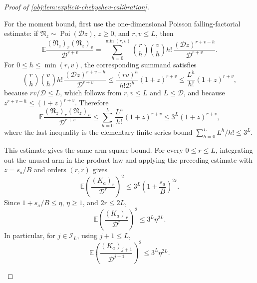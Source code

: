 \documentclass[11pt]{article}
\begin{document}
\begin{proof}[Proof of \cref{obj:lem:explicit-chebyshev-calibration}]
\begin{enumerate}
For the moment bound, first use the one-dimensional Poisson falling-factorial estimate: if
\(\mathfrak N_z\sim\operatorname{Poi}(\mathscr D z)\), \(z\ge0\), and \(r,v\le L\), then
\[
\mathbb E\frac{(\mathfrak N_z)_r(\mathfrak N_z)_v}{\mathscr D^{r+v}}
=
\sum_{h=0}^{\min(r,v)}
\binom rh\binom vh h!\,
\frac{(\mathscr D z)^{r+v-h}}{\mathscr D^{r+v}}.
\]
For \(0\le h\le\min(r,v)\), the corresponding summand satisfies
\[
\binom rh\binom vh h!\,
\frac{(\mathscr D z)^{r+v-h}}{\mathscr D^{r+v}}
\le
\frac{(rv)^h}{h!\mathscr D^h}(1+z)^{r+v}
\le
\frac{L^h}{h!}(1+z)^{r+v},
\]
because \(rv/\mathscr D\le L\), which follows from \(r,v\le L\) and \(L\le\mathscr D\), and because \(z^{r+v-h}\le(1+z)^{r+v}\). Therefore
\[
\mathbb E\frac{(\mathfrak N_z)_r(\mathfrak N_z)_v}{\mathscr D^{r+v}}
\le
\sum_{h=0}^{L}\frac{L^h}{h!}(1+z)^{r+v}
\le
3^L(1+z)^{r+v},
\]
where the last inequality is the elementary finite-series bound \(\sum_{h=0}^L L^h/h!\le3^L\).

This estimate gives the same-arm square bound. For every \(0\le r\le L\), integrating out the unused arm in the product law and applying the preceding estimate with \(z=s_a/B\) and orders \((r,r)\) gives
\[
\mathbb E\left(\frac{(K_a)_r}{\mathscr D^r}\right)^2
\le
3^L\left(1+\frac{s_a}{B}\right)^{2r}.
\]
Since \(1+s_a/B\le\eta\), \(\eta\ge1\), and \(2r\le2L\),
\[
\mathbb E\left(\frac{(K_a)_r}{\mathscr D^r}\right)^2
\le 3^L\eta^{2L}.
\]
In particular, for \(j\in\mathscr I_L\), using \(j+1\le L\),
\[
\mathbb E\left(\frac{(K_a)_{j+1}}{\mathscr D^{j+1}}\right)^2
\le
3^L\eta^{2L}.
\]


\end{enumerate}
\end{proof}
\end{document}

